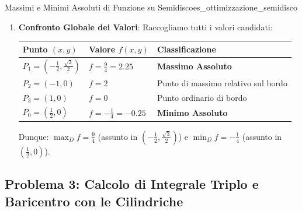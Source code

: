 \begin{esempio}{Massimi e Minimi Assoluti di Funzione su Semidisco}{es_ottimizzazione_semidisco}
\begin{enumerate}
\begin{itemize}
        \item \textbf{Tratto curvilineo $\Gamma_2$ (semicirconferenza superiore)}: $x^2 + y^2 = 1$ con $y \ge 0$.
        Sfruttiamo il vincolo $y^2 = 1 - x^2$ per $x \in [-1, 1]$:
        \[
        h(x) = x^2 + 2(1 - x^2) - x = x^2 + 2 - 2x^2 - x = -x^2 - x + 2, \quad x \in [-1, 1]
        \]
        Derivata: $h'(x) = -2x - 1 = 0 \implies x = -\frac{1}{2} \in (-1, 1)$.
        Ricaviamo la coordinata $y$: $y = \sqrt{1 - \left(-\frac{1}{2}\right)^2} = \sqrt{1 - \frac{1}{4}} = \frac{\sqrt{3}}{2} > 0$.
        Valutiamo la funzione nel punto $P_1 = \left(-\frac{1}{2}, \frac{\sqrt{3}}{2}\right)$:
        \[
        f\left(-\frac{1}{2}, \frac{\sqrt{3}}{2}\right) = h\left(-\frac{1}{2}\right) = -\left(-\frac{1}{2}\right)^2 - \left(-\frac{1}{2}\right) + 2 = -\frac{1}{4} + \frac{1}{2} + 2 = \frac{9}{4} = 2.25
        \]
        Gli estremi $x = \pm 1$ corrispondono ai punti $(\pm 1, 0)$ già esaminati su $\Gamma_1$.
    \end{itemize}

    \item \textbf{Confronto Globale dei Valori}:
    Raccogliamo tutti i valori candidati:
    \begin{center}
    \renewcommand{\arraystretch}{1.3}
    \begin{tabular}{lll}
    \toprule
    \textbf{Punto $(x,y)$} & \textbf{Valore $f(x,y)$} & \textbf{Classificazione} \\
    \midrule
    $P_1 = \left(-\frac{1}{2}, \frac{\sqrt{3}}{2}\right)$ & $f = \frac{9}{4} = 2.25$ & \textbf{Massimo Assoluto} \\
    $P_2 = (-1, 0)$ & $f = 2$ & Punto di massimo relativo sul bordo \\
    $P_3 = (1, 0)$ & $f = 0$ & Punto ordinario di bordo \\
    $P_0 = \left(\frac{1}{2}, 0\right)$ & $f = -\frac{1}{4} = -0.25$ & \textbf{Minimo Assoluto} \\
    \bottomrule
    \end{tabular}
    \end{center}
    Dunque: $\max_D f = \frac{9}{4}$ (assunto in $\left(-\frac{1}{2}, \frac{\sqrt{3}}{2}\right)$) e $\min_D f = -\frac{1}{4}$ (assunto in $\left(\frac{1}{2}, 0\right)$).
\end{enumerate}
\end{esempio}

\subsection{Problema 3: Calcolo di Integrale Triplo e Baricentro con le Cilindriche}

